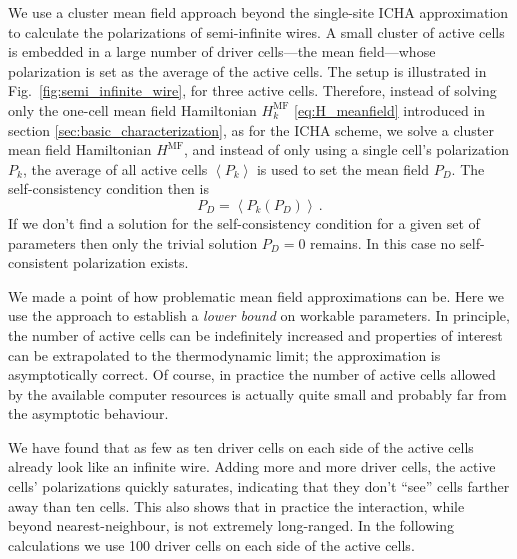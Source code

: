 We use a cluster mean field approach beyond the single-site ICHA approximation
to calculate the polarizations of semi-infinite wires. A small cluster of active
cells is embedded in a large number of driver cells---the mean field---whose
polarization is set as the average of the active cells. The setup is illustrated
in Fig.~\ref{fig:semi_infinite_wire}, for three active cells. Therefore, instead
of solving only the one-cell mean field Hamiltonian $H^{\mathrm{MF}}_k$
\eqref{eq:H_meanfield} introduced in section \ref{sec:basic_characterization},
as for the ICHA scheme, we solve a cluster mean field Hamiltonian
$H^{\mathrm{MF}}$, and instead of only using a single cell's polarization $P_k$,
the average of all active cells $\left< P_k \right>$ is used to set the mean
field $P_D$. The self-consistency condition then is
%
\begin{equation}
  P_D = \left< P_k \left( P_D \right) \right> \, .
\end{equation}
%
If we don't find a solution for the self-consistency condition for a given set
of parameters then only the trivial solution $P_D = 0$ remains. In this case no
self-consistent polarization exists.

We made a point of how problematic mean field approximations can be. Here we use
the approach to establish a \emph{lower bound} on workable parameters. In
principle, the number of active cells can be indefinitely increased and
properties of interest can be extrapolated to the thermodynamic limit; the
approximation is asymptotically correct. Of course, in practice the number of
active cells allowed by the available computer resources is actually quite small
and probably far from the asymptotic behaviour.

We have found that as few as ten driver cells on each side of the active cells
already look like an infinite wire. Adding more and more driver cells, the active
cells' polarizations quickly saturates, indicating that they don't ``see'' cells
farther away than ten cells. This also shows that in practice the interaction,
while beyond nearest-neighbour, is not extremely long-ranged. In the following
calculations we use 100 driver cells on each side of the active cells.

